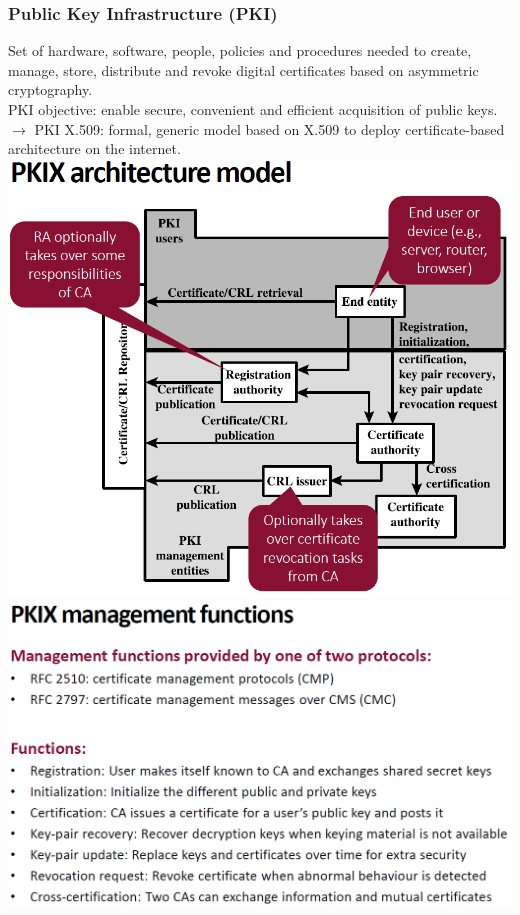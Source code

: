 \documentclass[12pt]{article}
\begin{document}
 \subsubsection{Public Key Infrastructure (PKI)}
 Set of hardware, software, people, policies and procedures needed to create, manage, store, distribute and revoke digital certificates based on asymmetric cryptography.\\
 PKI objective: enable secure, convenient and efficient acquisition of public keys.\\
 $\rightarrow$ PKI X.509: formal, generic model based on X.509 to deploy certificate-based architecture on the internet.\\
 \includegraphics[width=\linewidth]{./slides/L5P5PKIMOD.PNG}\\
 \includegraphics[width=\linewidth]{./slides/L5P5PKIMAN.PNG}
 
\end{document}
